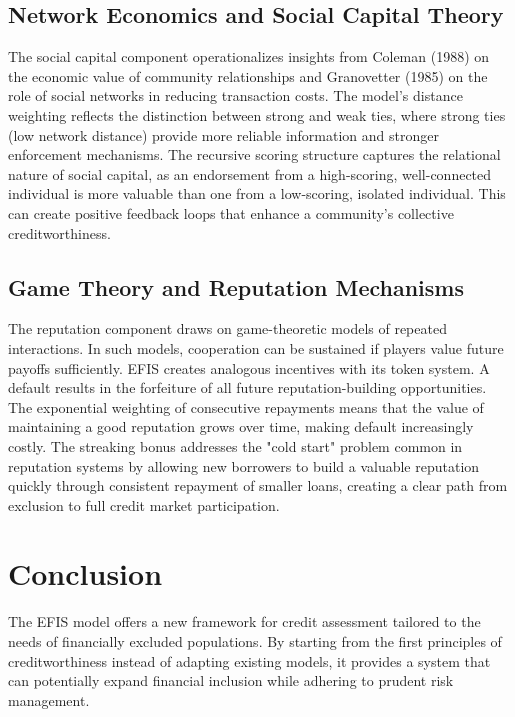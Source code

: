 \documentclass{article}
\begin{document}
\subsection{Network Economics and Social Capital Theory}

The social capital component operationalizes insights from Coleman (1988) on the economic value of community relationships and Granovetter (1985) on the role of social networks in reducing transaction costs. The model's distance weighting reflects the distinction between strong and weak ties, where strong ties (low network distance) provide more reliable information and stronger enforcement mechanisms. The recursive scoring structure captures the relational nature of social capital, as an endorsement from a high-scoring, well-connected individual is more valuable than one from a low-scoring, isolated individual. This can create positive feedback loops that enhance a community's collective creditworthiness.

\subsection{Game Theory and Reputation Mechanisms}

The reputation component draws on game-theoretic models of repeated interactions. In such models, cooperation can be sustained if players value future payoffs sufficiently. EFIS creates analogous incentives with its token system. A default results in the forfeiture of all future reputation-building opportunities. The exponential weighting of consecutive repayments means that the value of maintaining a good reputation grows over time, making default increasingly costly. The streaking bonus addresses the "cold start" problem common in reputation systems by allowing new borrowers to build a valuable reputation quickly through consistent repayment of smaller loans, creating a clear path from exclusion to full credit market participation.

\section{Conclusion}

The EFIS model offers a new framework for credit assessment tailored to the needs of financially excluded populations. By starting from the first principles of creditworthiness instead of adapting existing models, it provides a system that can potentially expand financial inclusion while adhering to prudent risk management.
\end{document}
